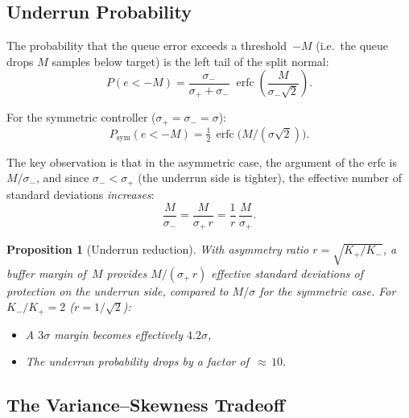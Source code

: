 \documentclass[11pt, a4paper]{article}
\theoremstyle{definition}
\theoremstyle{plain}
\newtheorem{proposition}[theorem]{Proposition}
\theoremstyle{remark}
\begin{document}
\subsection{Underrun Probability}%
\label{sec:asym-underrun}

The probability that the queue error exceeds a threshold~$-M$
(i.e.\ the queue drops $M$ samples below target) is the left
tail of the split normal:
\begin{equation}\label{eq:asym-underrun}
  P(e < -M)
    = \frac{\sigma_-}{\sigma_+ + \sigma_-}\;
      \operatorname{erfc}\!\left(
        \frac{M}{\sigma_-\sqrt{2}}
      \right).
\end{equation}

For the symmetric controller ($\sigma_+ = \sigma_- = \sigma$):
\begin{equation}
  P_{\text{sym}}(e < -M) = \tfrac{1}{2}\,
    \operatorname{erfc}\!\bigl(M/(\sigma\sqrt{2})\bigr).
\end{equation}

The key observation is that in the asymmetric case, the argument
of the erfc is $M/\sigma_-$, and since $\sigma_- < \sigma_+$ (the
underrun side is tighter), the effective number of standard
deviations \emph{increases}:
\begin{equation}
  \frac{M}{\sigma_-}
    = \frac{M}{\sigma_+\,r}
    = \frac{1}{r}\,\frac{M}{\sigma_+}.
\end{equation}

\begin{proposition}[Underrun reduction]%
\label{prop:underrun-reduction}
  With asymmetry ratio $r = \sqrt{K_+/K_-}$, a buffer margin
  of~$M$ provides $M/(\sigma_+\,r)$ effective standard deviations
  of protection on the underrun side, compared to $M/\sigma$ for
  the symmetric case.  For $K_-/K_+ = 2$ ($r = 1/\sqrt{2}$):
  \begin{itemize}
    \item A $3\sigma$ margin becomes effectively $4.2\sigma$,
    \item The underrun probability drops by a factor of~${\approx\,10}$.
  \end{itemize}
\end{proposition}

\subsection{The Variance--Skewness Tradeoff}%
\label{sec:var-skew-tradeoff}
\end{document}
